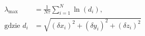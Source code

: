 \begin{align*}
  \lambda_{\text{max}} &= \frac{1}{N \tau} \sum_{i=1}^{N} \ln(d_i), \\
  \text{gdzie } d_i &= \sqrt{(\delta x_i)^2 + (\delta y_i)^2 + (\delta z_i)^2}
\end{align*}
